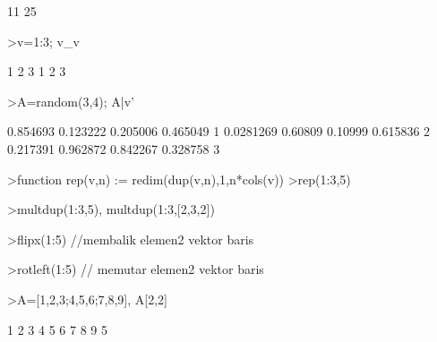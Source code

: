 \documentclass[a4paper,10pt]{article}
\begin{document}
\begin{eulernotebook}
\begin{eulercomment}
\begin{eulercomment}
\begin{euleroutput}
             11 
             25 
\end{euleroutput}
\begin{eulerprompt}
>v=1:3; v_v
\end{eulerprompt}
\begin{euleroutput}
              1             2             3 
              1             2             3 
\end{euleroutput}
\begin{eulerprompt}
>A=random(3,4); A|v'
\end{eulerprompt}
\begin{euleroutput}
       0.854693      0.123222      0.205006      0.465049             1 
      0.0281269       0.60809       0.10999      0.615836             2 
       0.217391      0.962872      0.842267      0.328758             3 
\end{euleroutput}
\begin{eulerprompt}
>function rep(v,n) := redim(dup(v,n),1,n*cols(v))
>rep(1:3,5)
\end{eulerprompt}
\begin{euleroutput}
  [1,  2,  3,  1,  2,  3,  1,  2,  3,  1,  2,  3,  1,  2,  3]
\end{euleroutput}
\begin{eulerprompt}
>multdup(1:3,5), multdup(1:3,[2,3,2])
\end{eulerprompt}
\begin{euleroutput}
  [1,  1,  1,  1,  1,  2,  2,  2,  2,  2,  3,  3,  3,  3,  3]
  [1,  1,  2,  2,  2,  3,  3]
\end{euleroutput}
\begin{eulerprompt}
>flipx(1:5) //membalik elemen2 vektor baris
\end{eulerprompt}
\begin{euleroutput}
  [5,  4,  3,  2,  1]
\end{euleroutput}
\begin{eulerprompt}
>rotleft(1:5) // memutar elemen2 vektor baris
\end{eulerprompt}
\begin{euleroutput}
  [2,  3,  4,  5,  1]
\end{euleroutput}
\begin{eulerprompt}
>A=[1,2,3;4,5,6;7,8,9], A[2,2]
\end{eulerprompt}
\begin{euleroutput}
              1             2             3 
              4             5             6 
              7             8             9 
  5
\end{euleroutput}

\end{eulercomment}
\end{eulercomment}
\end{eulernotebook}
\end{document}
